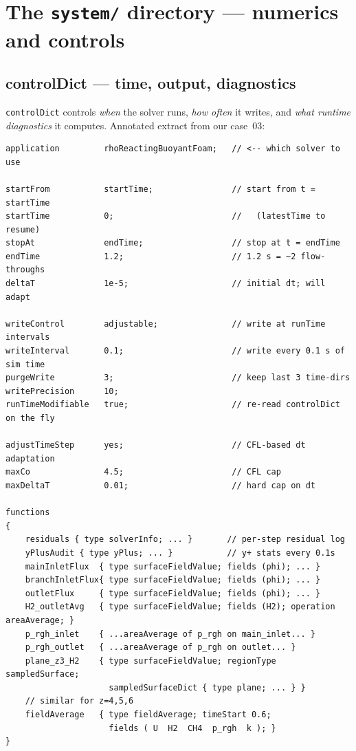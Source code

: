 \documentclass[11pt,a4paper]{article}
\begin{document}
\section{The \texttt{system/} directory --- numerics and controls}

\subsection{controlDict --- time, output, diagnostics}
\label{sec:controlDict}

\texttt{controlDict} controls \emph{when} the solver runs, \emph{how
often} it writes, and \emph{what runtime diagnostics} it computes.
Annotated extract from our case~03:

\begin{lstlisting}[style=foamstyle,caption={\texttt{system/controlDict} (annotated)}]
application         rhoReactingBuoyantFoam;   // <-- which solver to use

startFrom           startTime;                // start from t = startTime
startTime           0;                        //   (latestTime to resume)
stopAt              endTime;                  // stop at t = endTime
endTime             1.2;                      // 1.2 s = ~2 flow-throughs
deltaT              1e-5;                     // initial dt; will adapt

writeControl        adjustable;               // write at runTime intervals
writeInterval       0.1;                      // write every 0.1 s of sim time
purgeWrite          3;                        // keep last 3 time-dirs
writePrecision      10;
runTimeModifiable   true;                     // re-read controlDict on the fly

adjustTimeStep      yes;                      // CFL-based dt adaptation
maxCo               4.5;                      // CFL cap
maxDeltaT           0.01;                     // hard cap on dt

functions
{
    residuals { type solverInfo; ... }       // per-step residual log
    yPlusAudit { type yPlus; ... }           // y+ stats every 0.1s
    mainInletFlux  { type surfaceFieldValue; fields (phi); ... }
    branchInletFlux{ type surfaceFieldValue; fields (phi); ... }
    outletFlux     { type surfaceFieldValue; fields (phi); ... }
    H2_outletAvg   { type surfaceFieldValue; fields (H2); operation areaAverage; }
    p_rgh_inlet    { ...areaAverage of p_rgh on main_inlet... }
    p_rgh_outlet   { ...areaAverage of p_rgh on outlet... }
    plane_z3_H2    { type surfaceFieldValue; regionType sampledSurface;
                     sampledSurfaceDict { type plane; ... } }
    // similar for z=4,5,6
    fieldAverage   { type fieldAverage; timeStart 0.6;
                     fields ( U  H2  CH4  p_rgh  k ); }
}
\end{lstlisting}
\end{document}
